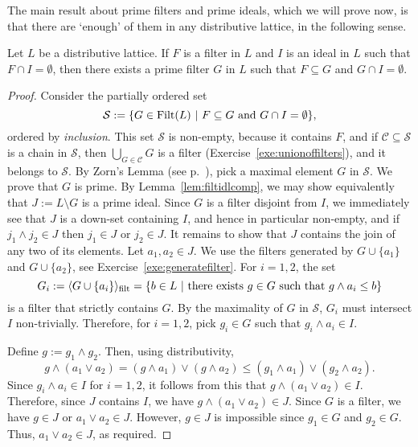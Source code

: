 The main result about prime filters and prime ideals, which we will prove now, is that there are `enough' of them in any distributive lattice, in the following sense.
\begin{theorem}\label{thm:DPF}
Let $L$ be a distributive lattice. If $F$ is a filter in $L$ and $I$ is an ideal in $L$ such that $F \cap I = \emptyset$, then there exists a prime filter $G$ in $L$ such that $F \subseteq G$ and $G \cap I = \emptyset$.
\end{theorem}
\begin{proof}
Consider the partially ordered set
\[\mathcal{S} := \{G \in \mathrm{Filt}(L) \ | \ F \subseteq G \text{ and } G \cap I = \emptyset\},\]
ordered by \emph{inclusion}. This set $\mathcal{S}$ is non-empty, because it contains $F$, and if $\mathcal{C} \subseteq \mathcal{S}$ is a chain in $\mathcal{S}$, then $\bigcup_{G \in \mathcal{C}} G$ is a filter (Exercise~\ref{exe:unionoffilters}), and it belongs to $\mathcal{S}$. By Zorn's Lemma (see p.~\pageref{lem:zorn}), pick a maximal element $G$ in $\mathcal{S}$. We prove that $G$ is prime. By Lemma~\ref{lem:filtidlcomp}, we may show equivalently that $J := L \setminus G$ is a prime ideal. Since $G$ is a filter disjoint from $I$, we immediately see that $J$ is a down-set containing $I$, and hence in particular non-empty, and if $j_1 \wedge j_2 \in J$ then $j_1 \in J$ or $j_2 \in J$. It remains to show that $J$ contains the join of any two of its elements. Let $a_1, a_2 \in J$.
We use the filters generated by $G \cup \{a_1\}$ and $G \cup \{a_2\}$, see Exercise~\ref{exe:generatefilter}. For $i = 1,2$, the set
\[ G_i := \langle G \cup \{a_i\} \rangle_{\mathrm{filt}} = \{b \in L \ | \ \text{there exists } g \in G \text{ such that } g \wedge a_i \leq b\}\]
is a filter that strictly contains $G$. By the maximality of $G$ in $\mathcal{S}$, $G_i$ must intersect $I$ non-trivially. Therefore, for $i = 1,2$, pick $g_i \in G$ such that $g_i \wedge a_i \in I$.


Define $g := g_1 \wedge g_2$. Then, using distributivity,
\[ g \wedge (a_1 \vee a_2) = (g \wedge a_1) \vee (g \wedge a_2) \leq (g_1 \wedge a_1) \vee (g_2 \wedge a_2).\]
Since $g_i \wedge a_i \in I$ for $i = 1,2$, it follows from this that $g \wedge (a_1 \vee a_2) \in I$. Therefore, since $J$ contains $I$, we have $g \wedge (a_1 \vee a_2) \in J$. Since $G$ is a filter, we have $g \in J$ or $a_1 \vee a_2 \in J$. However, $g \in J$ is impossible since $g_1 \in G$ and $g_2 \in G$. Thus, $a_1 \vee a_2 \in J$, as required.
\end{proof}

